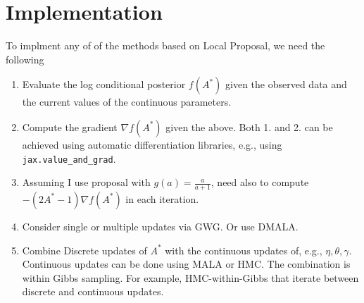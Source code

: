 \documentclass[12pt]{article}
\begin{document}
        \section{Implementation}
         To implment any of of the methods based on Local Proposal, we need the following
         \begin{enumerate}
            \item Evaluate the log conditional posterior $f(A^\ast)$ given the observed
                   data and the current values of the continuous parameters.
            \item Compute the gradient $\nabla f(A^\ast)$ given the above. 
                    Both 1. and 2. can be achieved using automatic differentiation libraries,
                    e.g., using \texttt{jax.value\_and\_grad}.
            \item Assuming I use proposal with $g(a) = \frac{a}{a+1}$, 
                    need also to compute $-(2A^\ast - 1)\nabla f(A^\ast)$ in each iteration.
            \item Consider single or multiple updates via GWG. Or use DMALA.
            \item Combine Discrete updates of $A^\ast$ with the continuous updates of, e.g., $\eta,\theta,\gamma$.
                  Continuous updates can be done using MALA or HMC. 
                  The combination is within Gibbs sampling.
                  For example, HMC-within-Gibbs that iterate between discrete and continuous updates.
        \end{enumerate}
\end{document}
